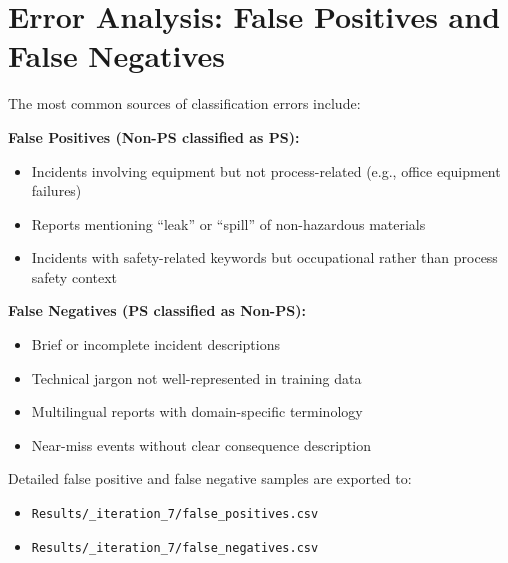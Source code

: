 \documentclass[11pt, titlepage, bibliography=totoc]{scrreprt}
\begin{document}
\section{Error Analysis: False Positives and False Negatives}

The most common sources of classification errors include:

\textbf{False Positives (Non-PS classified as PS):}
\begin{itemize}
    \item Incidents involving equipment but not process-related (e.g., office equipment failures)
    \item Reports mentioning ``leak'' or ``spill'' of non-hazardous materials
    \item Incidents with safety-related keywords but occupational rather than process safety context
\end{itemize}

\textbf{False Negatives (PS classified as Non-PS):}
\begin{itemize}
    \item Brief or incomplete incident descriptions
    \item Technical jargon not well-represented in training data
    \item Multilingual reports with domain-specific terminology
    \item Near-miss events without clear consequence description
\end{itemize}

Detailed false positive and false negative samples are exported to:
\begin{itemize}
    \item \texttt{Results/\_iteration\_7/false\_positives.csv}
    \item \texttt{Results/\_iteration\_7/false\_negatives.csv}
\end{itemize}

\printbibliography
\end{document}
